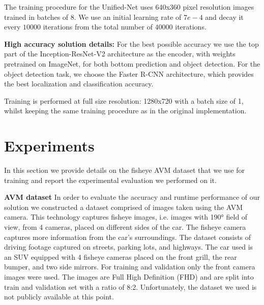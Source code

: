 \documentclass[10pt,twocolumn,letterpaper]{article}
\begin{document}


The training procedure for the Unified-Net uses 640x360 pixel resolution images trained in batches of 8. We use an initial learning rate of $7e-4$ and decay it every $10000$ iterations from the total number of $40000$ iterations.

\textbf{High accuracy solution details: } For the best possible accuracy we use the top part of the Inception-ResNet-V2 architecture as the encoder, with weights pretrained on ImageNet, for both bottom prediction and object detection. For the object detection task, we choose the Faster R-CNN architecture, which provides the best localization and classification accuracy.

Training is performed at full size resolution: 1280x720 with a batch size of 1, whilst keeping the same training procedure as in the original implementation. %

\section{Experiments}

In this section we provide details on the fisheye AVM dataset that we use for training and report the experimental evaluation we performed on it.

\textbf{AVM dataset } In order to evaluate the accuracy and runtime performance of our solution we constructed a dataset comprised of images taken using the AVM camera. This technology captures fisheye images, i.e. images with \ang{190} field of view, from 4 cameras, placed on different sides of the car. The fisheye camera captures more information from the car's surroundings. The dataset consists of driving footage captured on streets, parking lots, and highways. The car used is an SUV equipped with 4 fisheye cameras placed on the front grill, the rear bumper, and two side mirrors. For training and validation only the front camera images were used. The images are Full High Definition (FHD) and are split into train and validation set with a ratio of 8:2. Unfortunately, the dataset we used is not publicly available at this point.
\end{document}
